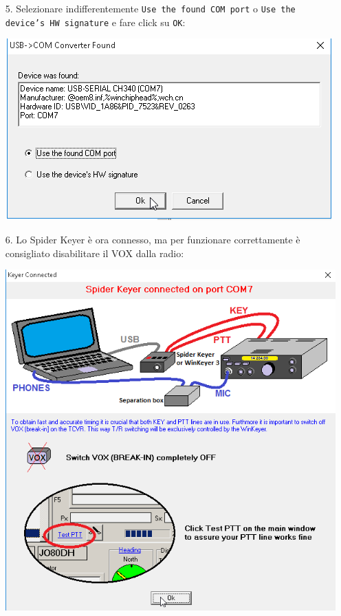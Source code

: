 \begin{enumerate}
		\item[5.] Selezionare indifferentemente \texttt{Use the found COM port} o \texttt{Use the device's HW signature} e fare click su \texttt{OK}:
 	\begin{center}
		\includegraphics[width=\linewidth]{./hamracer05.png}
	\end{center}
		\item[6.] Lo Spider Keyer \`e ora connesso, ma per funzionare correttamente \`e consigliato disabilitare il VOX dalla radio:
	\begin{center}
		\includegraphics[width=\linewidth]{./hamracer06.png}
	\end{center}
\end{enumerate}
\pagebreak
